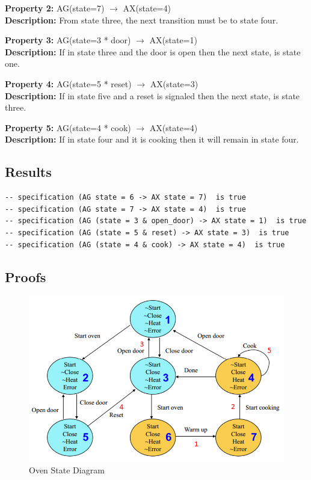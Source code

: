 \documentclass[11pt]{article}
\begin{document}
		\textbf{Property 2:} AG(state=7) $\to$ AX(state=4)\\ 
		\textbf{Description:} From state three, the next transition must be to state four. \\
		\vspace{12pt}
		
		\textbf{Property 3:} 	AG(state=3 * door) $\to$ AX(state=1)\\ 
		\textbf{Description:} If in state three and the door is open then the next state, is state one. \\
		\vspace{12pt}
		
		\textbf{Property 4:} AG(state=5 * reset) $\to$ AX(state=3) \\
		\textbf{Description:} If in state five and a reset is signaled then the next state, is state three.\\
		\vspace{12pt}
		
		\textbf{Property 5:} AG(state=4 * cook) $\to$ AX(state=4)  \\
		\textbf{Description:} If in state four and it is cooking then it will remain in state four.\\
		
		
	
	\subsection{Results}
		\begin{lstlisting}[caption=NuSMV Kripke Diagram Output, label=p2_2_out]	
-- specification (AG state = 6 -> AX state = 7)  is true
-- specification (AG state = 7 -> AX state = 4)  is true
-- specification (AG (state = 3 & open_door) -> AX state = 1)  is true
-- specification (AG (state = 5 & reset) -> AX state = 3)  is true
-- specification (AG (state = 4 & cook) -> AX state = 4)  is true
		\end{lstlisting}
	
	
	\subsection{Proofs}
	
	\begin{figure}[h]\centering
	\includegraphics[height=0.45\textwidth]{images/p2_2_proof.png}
		\caption{Oven State Diagram}
			\label{p2_p}
		\end{figure}
		
\end{document}
